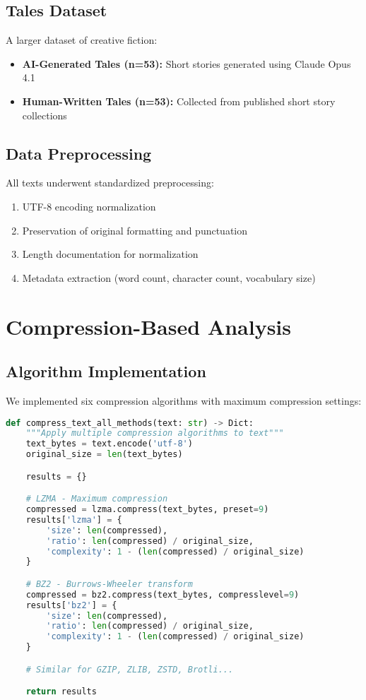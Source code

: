 \documentclass[12pt,a4paper]{report}
\begin{document}
\subsection{Tales Dataset}

A larger dataset of creative fiction:

\begin{itemize}
    \item \textbf{AI-Generated Tales (n=53):} Short stories generated using Claude Opus 4.1
    \item \textbf{Human-Written Tales (n=53):} Collected from published short story collections
\end{itemize}

\subsection{Data Preprocessing}

All texts underwent standardized preprocessing:
\begin{enumerate}
    \item UTF-8 encoding normalization
    \item Preservation of original formatting and punctuation
    \item Length documentation for normalization
    \item Metadata extraction (word count, character count, vocabulary size)
\end{enumerate}

\section{Compression-Based Analysis}

\subsection{Algorithm Implementation}

We implemented six compression algorithms with maximum compression settings:

\begin{lstlisting}[language=Python, caption=Compression Implementation]
def compress_text_all_methods(text: str) -> Dict:
    """Apply multiple compression algorithms to text"""
    text_bytes = text.encode('utf-8')
    original_size = len(text_bytes)

    results = {}

    # LZMA - Maximum compression
    compressed = lzma.compress(text_bytes, preset=9)
    results['lzma'] = {
        'size': len(compressed),
        'ratio': len(compressed) / original_size,
        'complexity': 1 - (len(compressed) / original_size)
    }

    # BZ2 - Burrows-Wheeler transform
    compressed = bz2.compress(text_bytes, compresslevel=9)
    results['bz2'] = {
        'size': len(compressed),
        'ratio': len(compressed) / original_size,
        'complexity': 1 - (len(compressed) / original_size)
    }

    # Similar for GZIP, ZLIB, ZSTD, Brotli...

    return results
\end{lstlisting}
\end{document}
